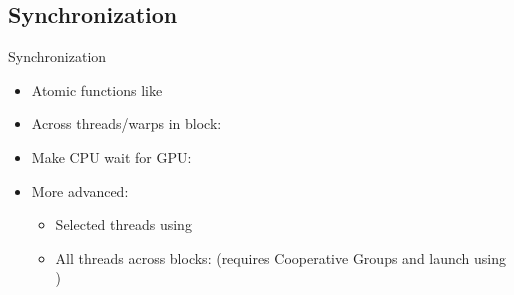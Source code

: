 \subsection{Synchronization}\label{subsec:synchronization}
\begin{frame}[fragile]{Synchronization}
    \center
    \begin{itemize}
        \item Atomic functions like 
        \item Across threads/warps in block: 
        \item Make CPU wait for GPU: 
        \item More advanced:
        \begin{itemize}
            \item Selected threads using 
            \item All threads across blocks:  (requires Cooperative Groups and launch using )
        \end{itemize}
    \end{itemize}
\end{frame}

